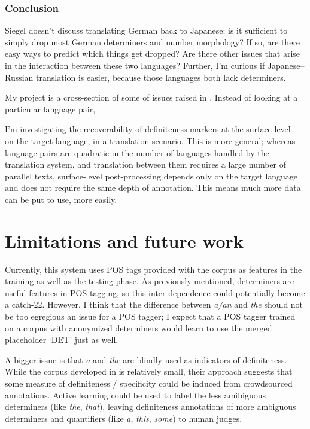 \documentclass[11pt]{article}
\begin{document}
\subsubsection*{Conclusion}

Siegel doesn't discuss translating German back to Japanese; is it sufficient to simply drop most German determiners and number morphology? If so, are there easy ways to predict which things get dropped? Are there other issues that arise in the interaction between these two languages? Further, I'm curious if Japanese--Russian translation is easier, because those languages both lack determiners.

My project is a cross-section of some of issues raised in \citet{siegel:1996}. Instead of looking at a particular language pair,

I'm investigating the recoverability of definiteness markers at the surface level---on the target language, in a translation scenario. This is more general; whereas language pairs are quadratic in the number of languages handled by the translation system, and translation between them requires a large number of parallel texts, surface-level post-processing depends only on the target language and does not require the same depth of annotation. This means much more data can be put to use, more easily.







\section{Limitations and future work}

Currently, this system uses POS tags provided with the corpus as features in the training as well as the testing phase. As previously mentioned, determiners are useful features in POS tagging, so this inter-dependence could potentially become a catch-22. However, I think that the difference between \emph{a/an} and \emph{the} should not be too egregious an issue for a POS tagger; I expect that a POS tagger trained on a corpus with anonymized determiners would learn to use the merged placeholder `DET' just as well.

A bigger issue is that \emph{a} and \emph{the} are blindly used as indicators of definiteness. While the corpus developed in \citet{vieira:2000} is relatively small, their approach suggests that some measure of definiteness / specificity could be induced from crowdsourced annotations. Active learning could be used to label the less amibiguous determiners (like \emph{the}, \emph{that}), leaving definiteness annotations of more ambiguous determiners and quantifiers (like \emph{a}, \emph{this}, \emph{some}) to human judges.
\end{document}
